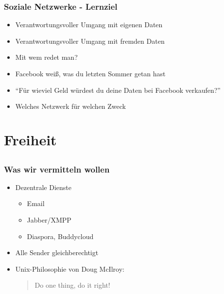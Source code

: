 \documentclass[14pt,handout]{beamer}
\begin{document}
\begin{frame}
    \frametitle{Soziale Netzwerke - Lernziel}
    \begin{itemize}
        \item<2-> Verantwortungsvoller Umgang mit eigenen Daten
        \item<3-> Verantwortungsvoller Umgang mit fremden Daten
        \item<4-> Mit wem redet man?
        \item<5-> Facebook weiß, was du letzten Sommer getan hast
        \item<6-> "`Für wieviel Geld würdest du deine Daten bei Facebook verkaufen?"'
        \item<7-> Welches Netzwerk für welchen Zweck
    \end{itemize}
\end{frame}

\section{Freiheit}
\subsection{}

\begin{frame}
    \frametitle{Was wir vermitteln wollen}
    \begin{itemize}
        \item<2-> Dezentrale Dienste
            \begin{itemize}
                \item<3-> Email
                \item<4-> Jabber/XMPP
                \item<5-> Diaspora, Buddycloud
            \end{itemize}
        \item<6-> Alle Sender gleichberechtigt
        \item<7-> Unix-Philosophie von Doug McIlroy:
            \begin{quote}Do one thing, do it right!
            \end{quote}
    \end{itemize}
\end{frame}
\end{document}
